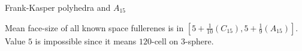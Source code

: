 \documentclass[%
pdf,
colorBG,
slideColor,
]{prosper}
\begin{document}
\begin{slide}{Frank-Kasper polyhedra and $A_{15}$}

\begin{center}
\begin{minipage}{5.5cm}
\begin{minipage}{25mm}
\centering
\epsfxsize=20mm
\par
\end{minipage}
\hfill\begin{minipage}{25mm}
\centering
\epsfxsize=25mm
\par
\end{minipage}
\begin{minipage}{25mm}
\centering
\epsfxsize=25mm
\par
\end{minipage}
\hfill\begin{minipage}{25mm}
\centering
\epsfxsize=25mm
\par
\end{minipage}
\end{minipage}
\begin{minipage}{5.5cm}
\centering
{}\par
\end{minipage}
\end{center}

Mean face-size of all known space fullerenes is in $[5 + \frac{1}{10} (C_{15}), 5 + \frac{1}{9} (A_{15})]$.
Value $5$ is impossible since it means $120$-cell on $3$-sphere.

\end{slide}
\end{document}

